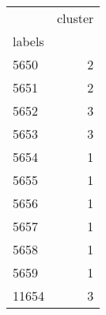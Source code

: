 \begin{tabular}{lr}
\toprule
{} &  cluster \\
labels &          \\
\midrule
5650   &        2 \\
5651   &        2 \\
5652   &        3 \\
5653   &        3 \\
5654   &        1 \\
5655   &        1 \\
5656   &        1 \\
5657   &        1 \\
5658   &        1 \\
5659   &        1 \\
11654  &        3 \\
\bottomrule
\end{tabular}
